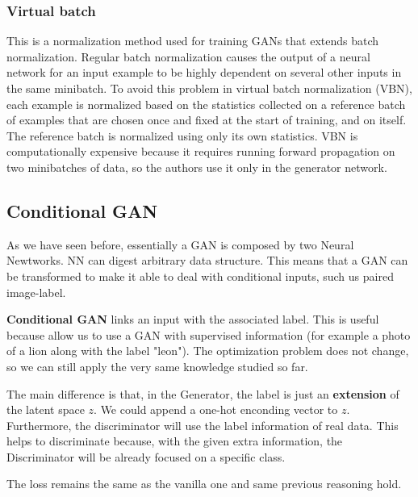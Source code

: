 \subsubsection{Virtual batch}

This is a normalization method used for training GANs that extends batch normalization. Regular batch normalization causes the output of a neural network for an input example to be highly dependent on several other inputs in the same minibatch. To avoid this problem in virtual batch normalization (VBN), each example is normalized based on the statistics collected on a reference batch of examples that are chosen once and fixed at the start of training, and on itself. The reference batch is normalized using only its own statistics. VBN is computationally expensive because it requires running forward propagation on two minibatches of data, so the authors use it only in the generator network.


\subsection{Conditional GAN}

As we have seen before, essentially a GAN is composed by two Neural Newtworks. NN can digest arbitrary data structure. This means that a GAN can be transformed to make it able to deal with conditional inputs, such us paired image-label.

\textbf{Conditional GAN} links an input with the associated label. This is useful because allow us to use a GAN with supervised information (for example a photo of a lion along with the label "leon"). The optimization problem does not change, so we can still apply the very same knowledge studied so far.

The main difference is that, in the Generator, the label is just an \textbf{extension} of the latent space $z$. We could append a one-hot enconding vector to $z$. Furthermore, the discriminator will use the label information of real data. This helps to discriminate because, with the given extra information, the Discriminator will be already focused on a specific class.

The loss remains the same as the vanilla one and same previous reasoning hold.

